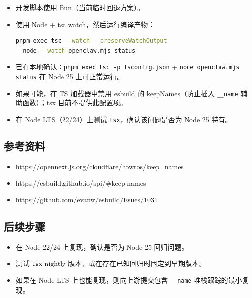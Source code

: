 \begin{itemize}
  \item 开发脚本使用 Bun（当前临时回退方案）。
  \item 使用 Node + tsc watch，然后运行编译产物：
\begin{lstlisting}[language=bash]
  pnpm exec tsc --watch --preserveWatchOutput
  node --watch openclaw.mjs status
\end{lstlisting}

  \item 已在本地确认：\texttt{pnpm exec tsc -p tsconfig.json} + \texttt{node openclaw.mjs status} 在 Node 25 上可正常运行。
  \item 如果可能，在 TS 加载器中禁用 esbuild 的 keepNames（防止插入 \texttt{\_\_name} 辅助函数）；tsx 目前不提供此配置项。
  \item 在 Node LTS（22/24）上测试 \texttt{tsx}，确认该问题是否为 Node 25 特有。
\end{itemize}


\subsection{参考资料}


\begin{itemize}
  \item https://opennext.js.org/cloudflare/howtos/keep\_names
  \item https://esbuild.github.io/api/\#keep-names
  \item https://github.com/evanw/esbuild/issues/1031
\end{itemize}


\subsection{后续步骤}


\begin{itemize}
  \item 在 Node 22/24 上复现，确认是否为 Node 25 回归问题。
  \item 测试 \texttt{tsx} nightly 版本，或在存在已知回归时固定到早期版本。
  \item 如果在 Node LTS 上也能复现，则向上游提交包含 \texttt{\_\_name} 堆栈跟踪的最小复现。
\end{itemize}



\clearpage

